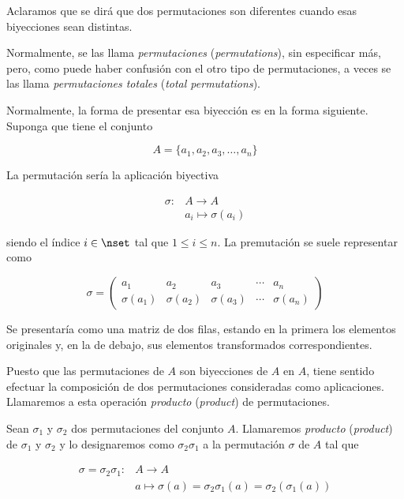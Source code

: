 Aclaramos que se dirá que dos permutaciones son diferentes cuando esas
biyecciones sean distintas.

Normalmente, se las llama \emph{permutaciones} (\emph{permutations}), sin
especificar más, pero, como puede haber confusión con el otro tipo de
permutaciones, a veces se las llama \emph{permutaciones totales} (\emph{total
permutations}).

Normalmente, la forma de presentar esa biyección es en la forma siguiente.
Suponga que tiene el conjunto

$$ A = \{a_1, a_2, a_3, \ldots, a_n\} $$

\noindent La permutación sería la aplicación biyectiva

\begin{equation*}
  \begin{array}{ll}
    \sigma: & A     \longrightarrow   A \\
            & a_i   \longmapsto       \sigma(a_i)
  \end{array}
\end{equation*}

\noindent siendo el índice $i \in \nset$ tal que $1 \leq i \leq n$. La
premutación se suele representar como

\begin{equation*}
  \sigma =
  \left(
  \begin{array}{ccccc}
      a_1         & a_2         & a_3         & \cdots  & a_n \\
      \sigma(a_1) & \sigma(a_2) & \sigma(a_3) & \cdots  & \sigma(a_n)
  \end{array}
  \right)
\end{equation*}

\noindent Se presentaría como una matriz de dos filas, estando en la primera
los elementos originales y, en la de debajo, sus elementos transformados
correspondientes.

Puesto que las permutaciones de $A$ son biyecciones de $A$ en $A$, tiene
sentido efectuar la composición de dos permutaciones consideradas como
aplicaciones. Llamaremos a esta operación \emph{producto} (\emph{product}) de
permutaciones.

\begin{deffinition}
  Sean $\sigma_1$ y $\sigma_2$ dos permutaciones del conjunto $A$.
  Llamaremos \emph{producto} (\emph{product}) de $\sigma_1$ y $\sigma_2$ y lo
  designaremos como $\sigma_2 \sigma_1$ a la permutación $\sigma$ de $A$ tal
  que

  \begin{equation*}
    \begin{array}{ll}
      \sigma = \sigma_2 \sigma_1:
        & A   \longrightarrow A \\
        & a   \longmapsto     \sigma(a) = \sigma_2\sigma_1(a) =
          \sigma_2(\sigma_1(a))
    \end{array}
  \end{equation*}
\end{deffinition}

